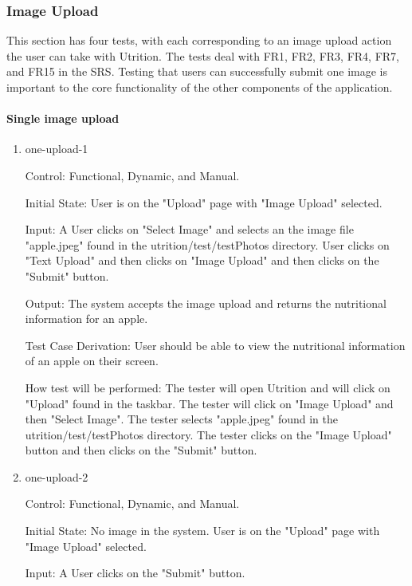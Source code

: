 \documentclass[12pt, titlepage]{article}
\begin{document}
	\subsubsection{Image Upload}
	This section has four tests, with each corresponding to an image upload action the user can take with Utrition. The tests deal with FR1, FR2, FR3, FR4, FR7, and FR15 in the SRS. 
	Testing that users can successfully submit one image is 
	important to the core functionality of the other components of the 
	application.
	
	\paragraph{Single image upload}
	
	\begin{enumerate}
		
		\item{one-upload-1\\}
		
		Control: Functional, Dynamic, and Manual.
		
		Initial State: User is on the "Upload" page with "Image Upload" selected.
		
		Input: A User clicks on "Select Image" and selects an the image file "apple.jpeg" found in the utrition/test/testPhotos directory. User clicks on "Text Upload" and then clicks on "Image Upload" and then clicks on the "Submit" button.
		
		Output: The system accepts the image upload and returns the nutritional information for an apple. 
		
		Test Case Derivation: User should be able to view the nutritional information of an apple on their screen.
		
		How test will be performed: The tester will open Utrition and will click on "Upload" found in the taskbar. The tester will click on "Image Upload" and then "Select Image". The tester selects "apple.jpeg" found in the utrition/test/testPhotos directory. The tester clicks on the "Image Upload" button and then clicks on the "Submit" button.
		
		\item{one-upload-2\\}
		
		Control: Functional, Dynamic, and Manual.
		
		Initial State: No image in the system. User is on the "Upload" page with "Image Upload" selected.
		
		Input: A User clicks on the "Submit" button.
		

\end{enumerate}
\end{document}
